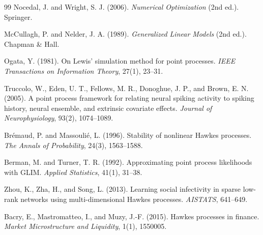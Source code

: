 \documentclass[11pt]{article}
\theoremstyle{plain}
\theoremstyle{definition}
\theoremstyle{remark}
\begin{document}
\begin{thebibliography}{99}
 Nocedal, J. and Wright, S. J. (2006). \emph{Numerical Optimization} (2nd ed.). Springer.

 McCullagh, P. and Nelder, J. A. (1989). \emph{Generalized Linear Models} (2nd ed.). Chapman \& Hall.

 Ogata, Y. (1981). On Lewis' simulation method for point processes. \emph{IEEE Transactions on Information Theory}, 27(1), 23--31.

 Truccolo, W., Eden, U. T., Fellows, M. R., Donoghue, J. P., and Brown, E. N. (2005). A point process framework for relating neural spiking activity to spiking history, neural ensemble, and extrinsic covariate effects. \emph{Journal of Neurophysiology}, 93(2), 1074--1089.

 Br\'emaud, P. and Massouli\'e, L. (1996). Stability of nonlinear Hawkes processes. \emph{The Annals of Probability}, 24(3), 1563--1588.

 Berman, M. and Turner, T. R. (1992). Approximating point process likelihoods with GLIM. \emph{Applied Statistics}, 41(1), 31--38.

 Zhou, K., Zha, H., and Song, L. (2013). Learning social infectivity in sparse low-rank networks using multi-dimensional Hawkes processes. \emph{AISTATS}, 641--649.

 Bacry, E., Mastromatteo, I., and Muzy, J.-F. (2015). Hawkes processes in finance. \emph{Market Microstructure and Liquidity}, 1(1), 1550005.

\end{thebibliography}
\end{document}
